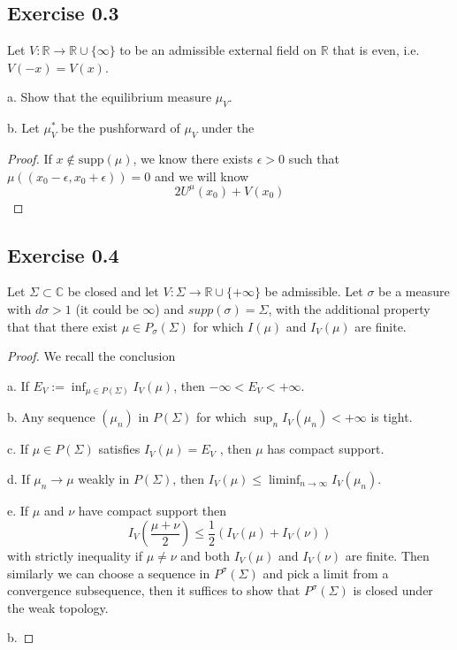\documentclass[lang=en,11pt,a4paper,citestyle =authoryear]{elegantpaper}
\newcommand{\R}{\mathbb{R}}
\newcommand{\C}{\mathbb{C}}
\begin{document}
\subsection*{Exercise 0.3}Let $V:\R\to \R\cup\{\infty\}$ to be an admissible external field on $\R$ that is even, i.e. $V(-x) = V(x)$.\par
a. Show that the equilibrium measure $\mu_V$.\par
b. Let $\mu_V^*$ be the pushforward of $\mu_V$ under the 
\begin{proof}
   If $x\notin \text{supp}(\mu)$, we know there exists $\epsilon >0 $ such that $\mu((x_0-\epsilon,x_0+\epsilon)) = 0$ and we will know
   \[
   2U^{\mu}(x_0) + V(x_0) 
   \] 
\end{proof}

\subsection*{Exercise 0.4}Let $\Sigma \subset \C$ be closed and let $V : \Sigma \to \R\cup\{+\infty\}$ be admissible. Let $\sigma$ be a measure with  $d\sigma > 1$ (it could be $\infty$) and $supp(\sigma) = \Sigma$, with the additional property that that there exist $\mu \in P_{\sigma}(\Sigma)$ for which $I(\mu)$ and $I_V (\mu)$ are finite.
\begin{proof}
    We recall the conclusion\par
    a. If $E_V := \inf_{\mu\in P(\Sigma)}I_V(\mu)$, then $−\infty < E_V < +\infty$.\par
    b. Any sequence $(\mu_n)$ in $P(\Sigma)$ for which $\sup_n I_V (\mu_n) < +\infty$ is tight.\par
    c. If $\mu \in P(\Sigma)$ satisfies $I_V (\mu) = E_V$ , then $\mu$ has compact support.\par
    d. If $\mu_n \to \mu$ weakly in $P(\Sigma)$, then $I_V (\mu) \leq  \liminf_{n\to\infty} I_V (\mu_n)$.\par
    e. If $\mu$ and $\nu$ have compact support then
    \[
    I_V(\dfrac{\mu+\nu}{2}) \leq \dfrac{1}{2}(I_V(\mu)+I_V(\nu))
    \]
    with strictly inequality if $\mu\neq \nu$ and both $I_V(\mu)$ and $I_V(\nu)$ are finite. Then similarly we can choose a sequence in $P^{\sigma}(\Sigma)$ and pick a limit from a convergence subsequence, then it suffices to show that $P^{\sigma}(\Sigma)$ is closed under the weak topology.\par
    b. 
\end{proof}

\addappheadtotoc
\end{document}

